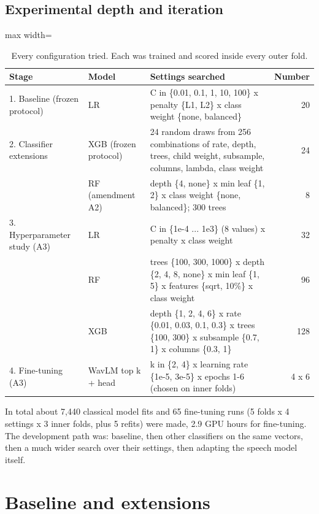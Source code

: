\documentclass[11pt,a4paper]{article}
\begin{document}
\subsection{Experimental depth and iteration}\label{sec:depth}
\begin{table}[H]\centering\footnotesize\renewcommand{\arraystretch}{1.15}
\caption{Every configuration tried. Each was trained and scored inside every outer fold.}
\begin{adjustbox}{max width=\linewidth}\begin{tabular}{p{3.4cm}p{2.9cm}p{8.0cm}r}
\toprule
\textbf{Stage} & \textbf{Model} & \textbf{Settings searched} & \textbf{Number}\\
\midrule
1. Baseline (frozen protocol) & LR & C in \{0.01, 0.1, 1, 10, 100\} x penalty \{L1, L2\} x class weight \{none, balanced\} & 20\\
2. Classifier extensions & XGB (frozen protocol) & 24 random draws from 256 combinations of rate, depth, trees, child weight, subsample, columns, lambda, class weight & 24\\
 & RF (amendment A2) & depth \{4, none\} x min leaf \{1, 2\} x class weight \{none, balanced\}; 300 trees & 8\\
3. Hyperparameter study (A3) & LR & C in \{1e-4 ... 1e3\} (8 values) x penalty x class weight & 32\\
 & RF & trees \{100, 300, 1000\} x depth \{2, 4, 8, none\} x min leaf \{1, 5\} x features \{sqrt, 10\%\} x class weight & 96\\
 & XGB & depth \{1, 2, 4, 6\} x rate \{0.01, 0.03, 0.1, 0.3\} x trees \{100, 300\} x subsample \{0.7, 1\} x columns \{0.3, 1\} & 128\\
4. Fine-tuning (A3) & WavLM top k + head & k in \{2, 4\} x learning rate \{1e-5, 3e-5\} x epochs 1-6 (chosen on inner folds) & 4 x 6\\
\bottomrule
\end{tabular}\end{adjustbox}\end{table}
In total about 7,440 classical model fits and 65 fine-tuning runs (5 folds x 4 settings x 3 inner folds, plus 5 refits) were made, 2.9 GPU hours for fine-tuning. The development path was: baseline, then other classifiers on the same vectors, then a much wider search over their settings, then adapting the speech model itself.

\section{Baseline and extensions}\label{sec:baseline}
\end{document}
